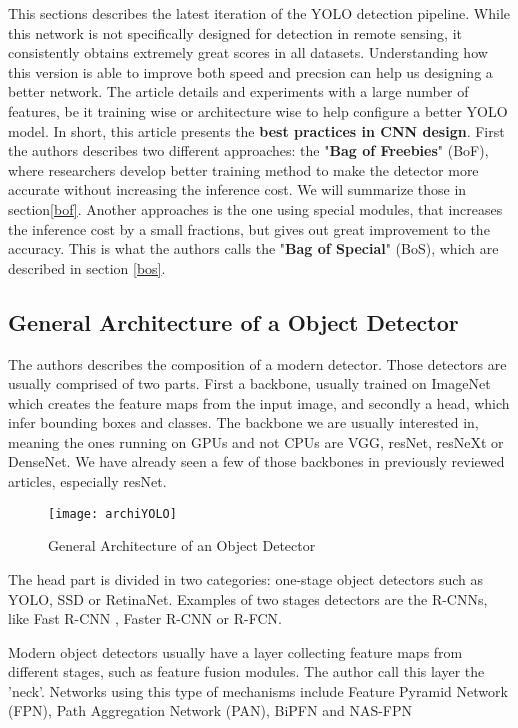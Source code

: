 This sections describes the latest iteration of the YOLO detection pipeline. While this network is not specifically designed for detection in remote sensing, it consistently obtains extremely great scores in all datasets. Understanding how this version is able to improve both speed and precsion can help us designing a better network. The article details and experiments with a large number of features, be it training wise or architecture wise to help configure a better YOLO model. In short, this article presents the \textbf{best practices in CNN design}. First the authors describes two different approaches: the "\textbf{Bag of Freebies}" (BoF), where researchers develop better training method to make the detector more accurate without increasing the inference cost. We will summarize those in section\ref{bof}. Another approaches is the one using special modules, that increases the inference cost by a small fractions, but gives out great improvement to the accuracy. This is what the authors calls the "\textbf{Bag of Special}" (BoS), which are described in section \ref{bos}. 


\subsection{General Architecture of a Object Detector}
The authors describes the composition of a modern detector. Those detectors are usually comprised of two parts. First a backbone, usually trained on ImageNet\cite{imageNet} which creates the feature maps from the input image, and secondly a head, which infer bounding boxes and classes. The backbone we are usually interested in, meaning the ones running on GPUs and not CPUs are VGG\cite{vgg}, resNet\cite{resNet}, resNeXt\cite{resNeXt} or DenseNet\cite{denseNet}. We have already seen a few of those backbones in previously reviewed articles, especially resNet.

\begin{figure}[h]
  \centering
  \texttt{[image: archiYOLO]}
	\caption{General Architecture of an Object Detector}
  \label{fig:genArchi}
\end{figure}
The head part is divided in two categories: one-stage object detectors such as YOLO\cite{yolov9000, yolov3}, SSD\cite{ssd} or RetinaNet\cite{retinaNet}. Examples of two stages detectors are the R-CNNs\cite{rcnn}, like Fast R-CNN \cite{fastRCNN}, Faster R-CNN\cite{FasterRCNN} or R-FCN\cite{rfcn}.

Modern object detectors usually have a layer collecting feature maps from different stages, such as feature fusion modules. The author call this layer the 'neck'. Networks using this type of mechanisms include Feature Pyramid Network (FPN)\cite{fpn}, Path Aggregation Network (PAN)\cite{pan}, BiPFN\cite{bifpn} and NAS-FPN\cite{nasFPN}

